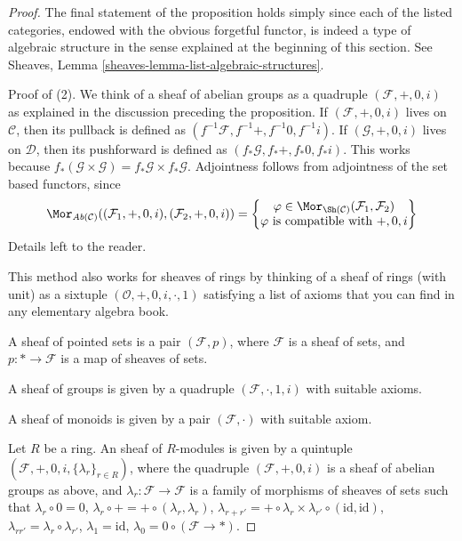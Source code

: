 \begin{proof}
The final statement of the proposition holds simply since each of the listed
categories, endowed with the obvious forgetful functor, is indeed a type of
algebraic structure in the sense explained at the beginning of this section.
See Sheaves, Lemma \ref{sheaves-lemma-list-algebraic-structures}.

\medskip\noindent
Proof of (2). We think of a sheaf of abelian groups as
a quadruple $(\mathcal{F}, +, 0, i)$ as explained in the discussion preceding
the proposition.
If $(\mathcal{F}, +, 0, i)$ lives on $\mathcal{C}$, then its pullback
is defined as $(f^{-1}\mathcal{F}, f^{-1}+, f^{-1}0, f^{-1}i)$.
If $(\mathcal{G}, +, 0, i)$ lives on $\mathcal{D}$, then its pushforward
is defined as $(f_*\mathcal{G}, f_*+, f_*0, f_*i)$. This works because
$f_*(\mathcal{G} \times \mathcal{G}) = f_*\mathcal{G} \times f_*\mathcal{G}$.
Adjointness follows from adjointness of the set based functors,
since
$$
\Mor_{\textit{Ab}(\mathcal{C})}
((\mathcal{F}_1, +, 0, i), (\mathcal{F}_2, +, 0, i))
=
\left\{
\begin{matrix}
\varphi \in \Mor_{\Sh(\mathcal{C})}
(\mathcal{F}_1, \mathcal{F}_2) \\
\varphi \text{ is compatible with }+, 0, i
\end{matrix}
\right\}
$$
Details left to the reader.

\medskip\noindent
This method also works for sheaves of rings by thinking
of a sheaf of rings (with unit) as a sixtuple
$(\mathcal{O}, + , 0, i, \cdot, 1)$ satisfying a list
of axioms that you can find in any elementary
algebra book.

\medskip\noindent
A sheaf of pointed sets is a pair $(\mathcal{F}, p)$, where
$\mathcal{F}$ is a sheaf of sets, and $p : * \to \mathcal{F}$
is a map of sheaves of sets.

\medskip\noindent
A sheaf of groups is given by a quadruple $(\mathcal{F}, \cdot, 1, i)$
with suitable axioms.

\medskip\noindent
A sheaf of monoids is given by a pair $(\mathcal{F}, \cdot)$
with suitable axiom.

\medskip\noindent
Let $R$ be a ring. An sheaf of $R$-modules is given by
a quintuple $(\mathcal{F}, +, 0, i, \{\lambda_r\}_{r \in R})$,
where the quadruple $(\mathcal{F}, +, 0, i)$ is a sheaf of
abelian groups as above, and $\lambda_r : \mathcal{F} \to \mathcal{F}$
is a family of morphisms of sheaves of sets
such that
$\lambda_r \circ 0 = 0$,
$\lambda_r \circ + = + \circ (\lambda_r, \lambda_r)$,
$\lambda_{r + r'} =
+ \circ \lambda_r \times \lambda_{r'} \circ (\text{id}, \text{id})$,
$\lambda_{rr'} = \lambda_r \circ \lambda_{r'}$,
$\lambda_1 = \text{id}$, $\lambda_0 = 0 \circ (\mathcal{F} \to *)$.
\end{proof}

